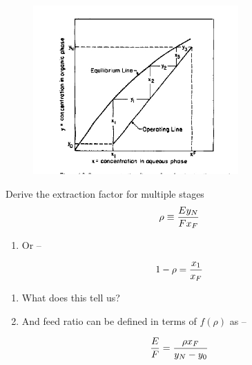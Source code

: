 \documentclass[aspectratio=1610,pdftex,dvipsnames,compress,xcolor={dvipsnames}]{beamer}
\begin{document}
\begin{frame}{}
    \begin{figure}
        \centering
        \href{http://www.tsijournals.com/articles-images/chemical-technology-McCabe-Thiele-uranium-11-5-102-g015.png}{\includegraphics[width=0.70\textwidth]{mccabe.jpg}}
    \end{figure}
\end{frame}


\begin{frame}{Derive the extraction factor for multiple stages}
    \begin{equation}
        \LARGE
        \rho \equiv \frac{Ey_N}{Fx_F}
    \end{equation}
    
    \vspace*{\fill}

    \begin{enumerate}[topsep=0pt,itemsep=18pt,leftmargin=*,label=(\arabic*)]
        \item[]Or -- 
    \end{enumerate}

    \vspace*{\fill}

    \begin{equation}
        \LARGE
        1 - \rho = \frac{x_1}{x_F}
    \end{equation}

    \vspace*{\fill}

    \begin{enumerate}[topsep=0pt,itemsep=18pt,leftmargin=*,label=(\arabic*)]
        \item[]What does this tell us?
        \item[]And feed ratio can be defined in terms of $f(\rho)$ as --
    \end{enumerate}

    \vspace*{\fill}

    \begin{equation}
        \LARGE
        \frac{E}{F} = \frac{\rho x_F}{y_N-y_0}
    \end{equation}
\end{frame}
\end{document}

